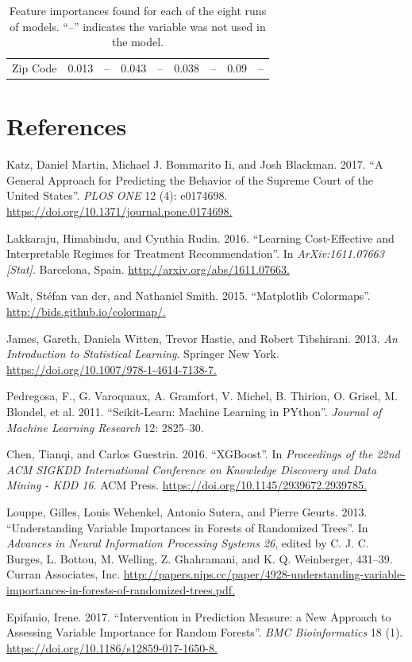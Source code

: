 \documentclass{AISB2008}
\begin{document}
\begin{table}[]
\begin{tabular}{@{}ccccc@{\qquad}cccc@{}}
Zip Code                  & 0.013                 & --                   & 0.043                & --                     & 0.038                 & --                   & 0.09                 & --                   \\ \cmidrule(r){2-5} \cmidrule(l){7-10} 
\end{tabular}
\caption{Feature importances found for each of the eight runs of models. ``--'' indicates the variable was not used in the model.}
\label{tab:featimp}
\end{table}

\FloatBarrier
\section*{References}\sloppy
{}
\label{csl:1}Katz, Daniel Martin, Michael J. Bommarito Ii, and Josh Blackman. 2017. ``{A General Approach for Predicting the Behavior of the {Supreme} {Court} of the {United} {States}}''. \textit{PLOS ONE} 12 (4): e0174698. \url{https://doi.org/10.1371/journal.pone.0174698.}

\label{csl:2}Lakkaraju, Himabindu, and Cynthia Rudin. 2016. ``{Learning {Cost}-{Effective} and {Interpretable} {Regimes} for {Treatment} {Recommendation}}''. In \textit{{ArXiv}:1611.07663 [Stat]}. Barcelona, Spain. \url{http://arxiv.org/abs/1611.07663.}

\label{csl:3}Walt, Stéfan van der, and Nathaniel Smith. 2015. ``{Matplotlib Colormaps}''. \url{http://bids.github.io/colormap/.}

\label{csl:4}James, Gareth, Daniela Witten, Trevor Hastie, and Robert Tibshirani. 2013. \textit{{An Introduction to Statistical Learning}}. Springer New York. \url{https://doi.org/10.1007/978-1-4614-7138-7.}

\label{csl:5}Pedregosa, F., G. Varoquaux, A. Gramfort, V. Michel, B. Thirion, O. Grisel, M. Blondel, et al. 2011. ``{Scikit-Learn: Machine Learning in {P}Ython}''. \textit{Journal of Machine Learning Research} 12: 2825–30.

\label{csl:6}Chen, Tianqi, and Carlos Guestrin. 2016. ``{XGBoost}''. In \textit{Proceedings of the 22nd {ACM} {SIGKDD} International Conference on Knowledge Discovery and Data Mining - {KDD} {\Textquotesingle}16}. {ACM} Press. \url{https://doi.org/10.1145/2939672.2939785.}

\label{csl:7}Louppe, Gilles, Louis Wehenkel, Antonio Sutera, and Pierre Geurts. 2013. ``{Understanding Variable Importances in Forests of Randomized Trees}''. In \textit{Advances in Neural Information Processing Systems 26}, edited by C. J. C. Burges, L. Bottou, M. Welling, Z. Ghahramani, and K. Q. Weinberger, 431–39. Curran Associates, Inc. \url{http://papers.nips.cc/paper/4928-understanding-variable-importances-in-forests-of-randomized-trees.pdf.}

\label{csl:8}Epifanio, Irene. 2017. ``{Intervention in Prediction Measure: a New Approach to Assessing Variable Importance for Random Forests}''. \textit{{BMC} Bioinformatics} 18 (1). \url{https://doi.org/10.1186/s12859-017-1650-8.}
\end{document}
